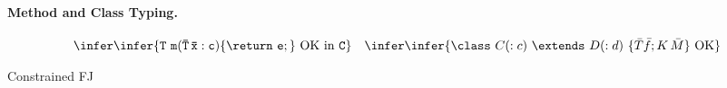 \documentclass[nocopyrightspace,preprint,10pt]{sigplanconf}
\def\from#1\infer#2{{{\textstyle #1}\over{\textstyle #2}}}
\def\subtype{\sqsubseteq}
\begin{document}
\begin{table}
\paragraph{Method and Class Typing.}
$$
\begin{array}{ll}
\from{ \bar{T}\ \bar{x}, C\ \this, c \vdash S\ e, S \subtype T }   
\infer{\tt T\ m(\bar{\tt T}\,\bar{\tt x} : c)\{\return\ e;\}\ \mbox{OK in}\ C} &
\from{
  \begin{array}{l}
    K=C(\bar{S}\ \bar{g},\bar{T}\ \bar{f} : c')\{\super(\bar{g});\this.\bar{f}=\bar{f};\}\\
    fields(D)=\bar{S}\ \bar{g}\ \\ 
    \bar{S}\ \bar{g}, \bar{T}\ \bar{f}, \this.\bar{g}=\bar{g}, \this.\bar{f}=\bar{f}, c' \vdash c,d \\
    \bar{M}\ \mbox{OK in}\ C\\
  \end{array}}
\infer{\class\ C(:c)\ \extends\ D(:d)\ \{\bar{T}\bar{f};K\,\bar{M}\}\ \mbox{OK}} 
\end{array}
$$

\caption{Constrained FJ}\label{FJ-Table}
\end{table}
\end{document}
